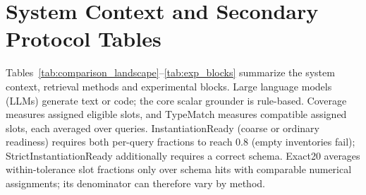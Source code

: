 \documentclass[pdflatex,sn-basic,Numbered]{sn-jnl}
\begin{document}
\section{System Context and Secondary Protocol Tables}
Tables~\ref{tab:comparison_landscape}--\ref{tab:exp_blocks} summarize the system context, retrieval methods and experimental blocks. Large language models (LLMs) generate text or code; the core scalar grounder is rule-based. Coverage measures assigned eligible slots, and TypeMatch measures compatible assigned slots, each averaged over queries. InstantiationReady (coarse or ordinary readiness) requires both per-query fractions to reach 0.8 (empty inventories fail); StrictInstantiationReady additionally requires a correct schema. Exact20 averages within-tolerance slot fractions only over schema hits with comparable numerical assignments; its denominator can therefore vary by method.
\end{document}
